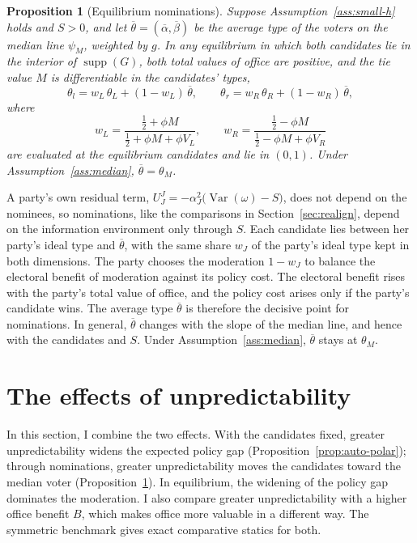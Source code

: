 \documentclass[12pt,letterpaper]{article}
\newtheorem{proposition}{Proposition}
\begin{document}
\begin{proposition}[Equilibrium nominations]\label{prop:nomination}
Suppose Assumption~\ref{ass:small-h} holds and $S>0$, and let $\overline{\theta}=(\overline{\alpha},\overline{\beta})$ be the average type of the voters on the median line $\psi_M$, weighted by $g$. In any equilibrium in which both candidates lie in the interior of $\operatorname{supp}(G)$, both total values of office are positive, and the tie value $M$ is differentiable in the candidates' types,
\[
\theta_l=w_L\,\theta_L+(1-w_L)\,\overline{\theta},
\qquad
\theta_r=w_R\,\theta_R+(1-w_R)\,\overline{\theta},
\]
where
\[
w_L=\frac{\tfrac12+\phi M}{\tfrac12+\phi M+\phi V_L},
\qquad
w_R=\frac{\tfrac12-\phi M}{\tfrac12-\phi M+\phi V_R}
\]
are evaluated at the equilibrium candidates and lie in $(0,1)$. Under Assumption~\ref{ass:median}, $\overline{\theta}=\theta_M$.
\end{proposition}

A party's own residual term, $U_J^J=-\alpha_J^2\big(\operatorname{Var}(\omega)-S\big)$, does not depend on the nominees, so nominations, like the comparisons in Section~\ref{sec:realign}, depend on the information environment only through $S$. Each candidate lies between her party's ideal type and $\overline{\theta}$, with the same share $w_J$ of the party's ideal type kept in both dimensions. The party chooses the moderation $1-w_J$ to balance the electoral benefit of moderation against its policy cost. The electoral benefit rises with the party's total value of office, and the policy cost arises only if the party's candidate wins. The average type $\overline{\theta}$ is therefore the decisive point for nominations. In general, $\overline{\theta}$ changes with the slope of the median line, and hence with the candidates and $S$. Under Assumption~\ref{ass:median}, $\overline{\theta}$ stays at $\theta_M$.


\section{The effects of unpredictability}\label{sec:effects}

In this section, I combine the two effects. With the candidates fixed, greater unpredictability widens the expected policy gap (Proposition~\ref{prop:auto-polar}); through nominations, greater unpredictability moves the candidates toward the median voter (Proposition~\ref{prop:nomination}). In equilibrium, the widening of the policy gap dominates the moderation. I also compare greater unpredictability with a higher office benefit $B$, which makes office more valuable in a different way. The symmetric benchmark gives exact comparative statics for both.
\end{document}
